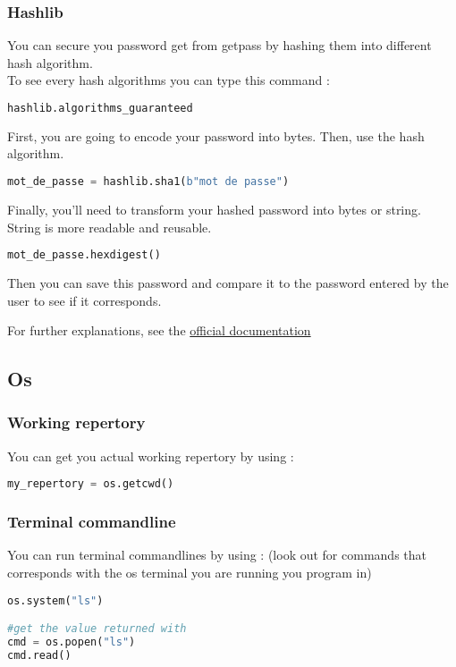 \documentclass[a4paper, 12pt, titlepage]{scrartcl} %
\begin{document}
\subsubsection{Hashlib}
You can secure you password get from getpass by hashing them into different hash algorithm.\\
To see every hash algorithms you can type this command : 
\begin{lstlisting}[language=Python]
hashlib.algorithms_guaranteed
\end{lstlisting}
First, you are going to encode your password into bytes. Then, use the hash algorithm.
\begin{lstlisting}[language=Python]
mot_de_passe = hashlib.sha1(b"mot de passe")
\end{lstlisting}
Finally, you'll need to transform your hashed password into bytes or string. String is more readable and reusable.
\begin{lstlisting}[language=Python]
mot_de_passe.hexdigest()
\end{lstlisting}
Then you can save this password and compare it to the password entered by the user to see if it corresponds.



For further explanations, see the \href{https://docs.python.org/3/library/hashlib.html}{official documentation}


\subsection{Os}
\subsubsection{Working repertory}
You can get you actual working repertory by using :
\begin{lstlisting}[language=Python]
my_repertory = os.getcwd()
\end{lstlisting}

\subsubsection{Terminal commandline}
You can run terminal commandlines by using : (look out for commands that corresponds with the os terminal you are running you program in)
\begin{lstlisting}[language=Python]
os.system("ls")

#get the value returned with
cmd = os.popen("ls")
cmd.read()
\end{lstlisting}
\end{document}
